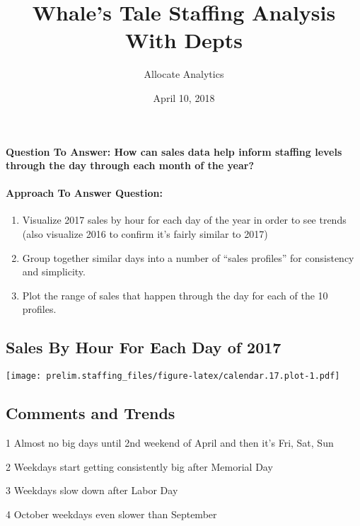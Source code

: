 \documentclass[]{article}
\title{Whale's Tale Staffing Analysis With Depts}
\author{Allocate Analytics}
\date{April 10, 2018}
\let\oldparagraph\paragraph
\renewcommand{\paragraph}[1]{\oldparagraph{#1}\mbox{}}
\begin{document}
\maketitle

\paragraph{Question To Answer: How can sales data help inform staffing
levels through the day through each month of the
year?}\label{question-to-answer-how-can-sales-data-help-inform-staffing-levels-through-the-day-through-each-month-of-the-year}

\paragraph{Approach To Answer
Question:}\label{approach-to-answer-question}

\begin{enumerate}
\def\labelenumi{\arabic{enumi}.}
\item
  Visualize 2017 sales by hour for each day of the year in order to see
  trends (also visualize 2016 to confirm it's fairly similar to 2017)
\item
  Group together similar days into a number of ``sales profiles'' for
  consistency and simplicity.
\item
  Plot the range of sales that happen through the day for each of the 10
  profiles.
\end{enumerate}

\subsection{Sales By Hour For Each Day of
2017}\label{sales-by-hour-for-each-day-of-2017}

\texttt{[image: prelim.staffing\_files/figure-latex/calendar.17.plot-1.pdf]}

\subsection{Comments and Trends}\label{comments-and-trends}

1 Almost no big days until 2nd weekend of April and then it's Fri, Sat,
Sun

2 Weekdays start getting consistently big after Memorial Day

3 Weekdays slow down after Labor Day

4 October weekdays even slower than September
\end{document}
